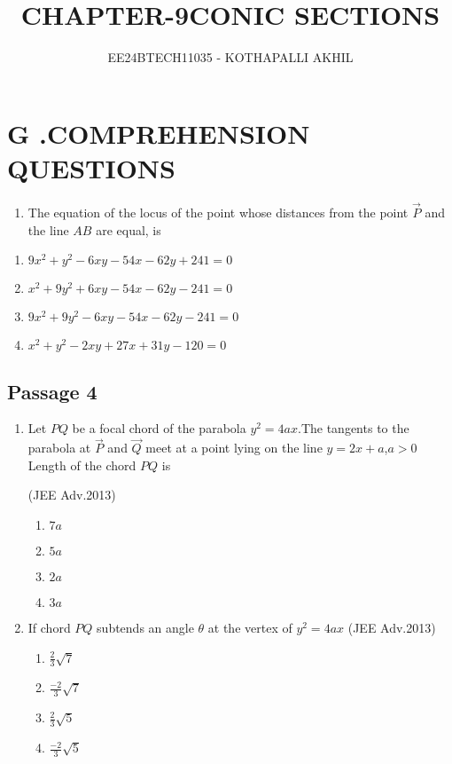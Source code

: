 \documentclass[journal]{IEEEtran}
\renewcommand{\thefigure}{\theenumi}
\renewcommand{\thetable}{\theenumi}
\numberwithin{equation}{enumi}
\numberwithin{figure}{enumi}
\renewcommand{\thetable}{\theenumi}
\begin{document}

\vspace{3cm}
\title{CHAPTER-9}
\title{CONIC SECTIONS}
\author{EE24BTECH11035 - KOTHAPALLI AKHIL}
\maketitle

\bigskip

\renewcommand{\thefigure}{\theenumi}
\renewcommand{\thetable}{\theenumi}
\section*{G .COMPREHENSION QUESTIONS }
\begin{enumerate}
\item  The equation of the locus of the point whose distances from the point $\Vec{P}$ and the line $AB$ are equal, is
\end{enumerate}

\begin{enumerate}
     \item $9x^2+y^2-6xy-54x-62y+241=0$
     \item $x^2+9y^2+6xy-54x-62y-241=0$
     \item $9x^2+9y^2-6xy-54x-62y-241=0$
     \item $x^2+y^2-2xy+27x+31y-120=0$
\end{enumerate}
\subsection*{Passage 4} 
\begin{enumerate}
\item Let $PQ$ be a focal chord of the parabola $y^2=4ax$.The tangents to the parabola at $\Vec{P}$ and $\Vec{Q}$ meet at a point lying on the line $y=2x+a$,$a>0$
Length of the chord $PQ$ is

\hfill(JEE Adv.2013)        
\begin{enumerate}
    \item $7a$
    \item $5a$
    \item $2a$
    \item $3a$
\end{enumerate}

\item If chord $PQ$ subtends an angle $\theta$  at the vertex of $y^2=4ax$
\hfill(JEE Adv.2013)

\begin{enumerate}
    \item $\frac{2}{3}\sqrt{7}$
    
    \item $\frac{-2}{3}\sqrt{7}$
    
    \item $\frac{2}{3}\sqrt{5}$
    
    \item $\frac{-2}{3}\sqrt{5}$
\end{enumerate}
\end{enumerate}
\end{document}
